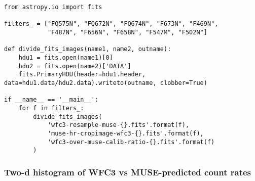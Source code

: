 \documentclass[11pt]{article}
\begin{document}
\begin{verbatim}
from astropy.io import fits

filters_ = ["FQ575N", "FQ672N", "FQ674N", "F673N", "F469N",
            "F487N", "F656N", "F658N", "F547M", "F502N"]

def divide_fits_images(name1, name2, outname):
    hdu1 = fits.open(name1)[0]
    hdu2 = fits.open(name2)['DATA']
    fits.PrimaryHDU(header=hdu1.header, data=hdu1.data/hdu2.data).writeto(outname, clobber=True)

if __name__ == '__main__':
    for f in filters_:
        divide_fits_images(
            'wfc3-resample-muse-{}.fits'.format(f),
            'muse-hr-cropimage-wfc3-{}.fits'.format(f),
            'wfc3-over-muse-calib-ratio-{}.fits'.format(f)
        )
\end{verbatim}


\subsubsection{Two-d histogram of WFC3 vs MUSE-predicted count rates}
\label{sec:orgheadline41}
\end{document}
